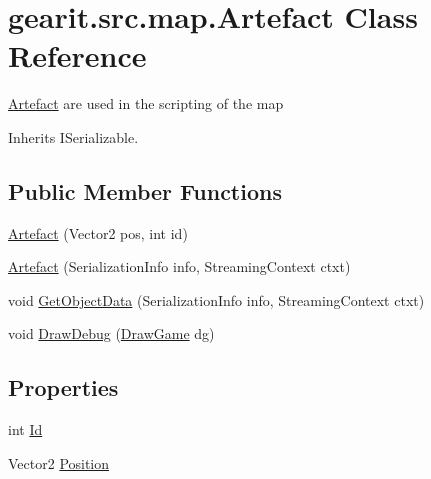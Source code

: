 \hypertarget{classgearit_1_1src_1_1map_1_1_artefact}{\section{gearit.\+src.\+map.\+Artefact Class Reference}
\label{classgearit_1_1src_1_1map_1_1_artefact}
}


\hyperlink{classgearit_1_1src_1_1map_1_1_artefact}{Artefact} are used in the scripting of the map  




Inherits I\+Serializable.

\subsection*{Public Member Functions}
\begin{DoxyCompactItemize}
\item 
\hyperlink{classgearit_1_1src_1_1map_1_1_artefact_a19023046a280c9c1ca87f76ceea87b4a}{Artefact} (Vector2 pos, int id)
\item 
\hyperlink{classgearit_1_1src_1_1map_1_1_artefact_aff547188072d614ed5040cb72134db6f}{Artefact} (Serialization\+Info info, Streaming\+Context ctxt)
\item 
void \hyperlink{classgearit_1_1src_1_1map_1_1_artefact_a0d6e78e4ae3b79b98cae59e6b562aa7b}{Get\+Object\+Data} (Serialization\+Info info, Streaming\+Context ctxt)
\item 
void \hyperlink{classgearit_1_1src_1_1map_1_1_artefact_a6cd379337f43ad4884e52899fb733e7f}{Draw\+Debug} (\hyperlink{classgearit_1_1src_1_1_draw_game}{Draw\+Game} dg)
\end{DoxyCompactItemize}
\subsection*{Properties}
\begin{DoxyCompactItemize}
\item 
int \hyperlink{classgearit_1_1src_1_1map_1_1_artefact_a47218e1d5629a09d6f9ee094b362fe05}{Id}
\item 
Vector2 \hyperlink{classgearit_1_1src_1_1map_1_1_artefact_ad00862e22dc51f3ddeefa1fd2b2ba124}{Position}
\end{DoxyCompactItemize}


